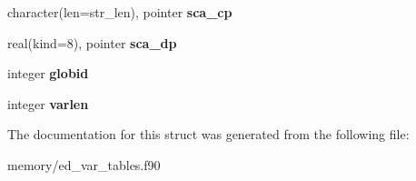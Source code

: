 \begin{DoxyCompactItemize}
\item 
\hypertarget{structed__var__tables_1_1var__table__vector_accfd240783d56034bc8c00e70bb6a38c}{
character(len=str\_\-len), pointer {\bfseries sca\_\-cp}}
\label{structed__var__tables_1_1var__table__vector_accfd240783d56034bc8c00e70bb6a38c}

\item 
\hypertarget{structed__var__tables_1_1var__table__vector_a676e7466dbda2db6a86c559133cc4765}{
real(kind=8), pointer {\bfseries sca\_\-dp}}
\label{structed__var__tables_1_1var__table__vector_a676e7466dbda2db6a86c559133cc4765}

\item 
\hypertarget{structed__var__tables_1_1var__table__vector_a05c97629e910604a0c342c40a166aadb}{
integer {\bfseries globid}}
\label{structed__var__tables_1_1var__table__vector_a05c97629e910604a0c342c40a166aadb}

\item 
\hypertarget{structed__var__tables_1_1var__table__vector_a53166b674050c25a50ccbe6788f8ddcb}{
integer {\bfseries varlen}}
\label{structed__var__tables_1_1var__table__vector_a53166b674050c25a50ccbe6788f8ddcb}

\end{DoxyCompactItemize}


The documentation for this struct was generated from the following file:\begin{DoxyCompactItemize}
\item 
memory/ed\_\-var\_\-tables.f90\end{DoxyCompactItemize}
